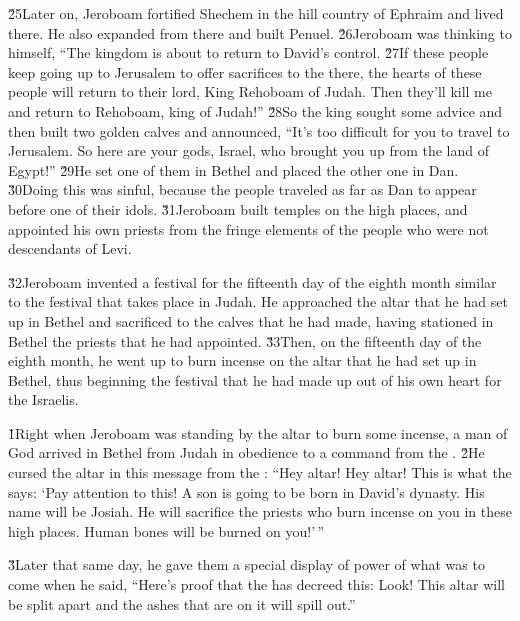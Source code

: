 \v{25}Later on, Jeroboam fortified Shechem in the hill country of Ephraim and lived there. He also expanded from there and built Penuel. \v{26}Jeroboam was thinking to himself, ``The kingdom is about to return to David's control. \v{27}If these people keep going up to Jerusalem to offer sacrifices to the  there, the hearts of these people will return to their lord, King Rehoboam of Judah. Then they'll kill me and return to Rehoboam, king of Judah!'' \v{28}So the king sought some advice and then built two golden calves and announced, ``It's too difficult for you to travel to Jerusalem. So here are your gods, Israel, who brought you up from the land of Egypt!'' \v{29}He set one of them in Bethel and placed the other one in Dan. \v{30}Doing this was sinful, because the people traveled as far as Dan to appear before one of their idols. \v{31}Jeroboam built temples on the high places, and appointed his own priests from the fringe elements of the people who were not descendants of Levi.

\v{32}Jeroboam invented a festival for the fifteenth day of the eighth month similar to the festival that takes place in Judah. He approached the altar that he had set up in Bethel and sacrificed to the calves that he had made, having stationed in Bethel the priests that he had appointed. \v{33}Then, on the fifteenth day of the eighth month, he went up to burn incense on the altar that he had set up in Bethel, thus beginning the festival that he had made up out of his own heart for the Israelis.

\v{1}Right when Jeroboam was standing by the altar to burn some incense, a man of God arrived in Bethel from Judah in obedience to a command from the . \v{2}He cursed the altar in this message from the : ``Hey altar! Hey altar! This is what the  says: `Pay attention to this! A son is going to be born in David's dynasty. His name will be Josiah. He will sacrifice the priests who burn incense on you in these high places. Human bones will be burned on you!'\,''

\v{3}Later that same day, he gave them a special display of power of what was to come when he said, ``Here's proof that the  has decreed this: Look! This altar will be split apart and the ashes that are on it will spill out.''

